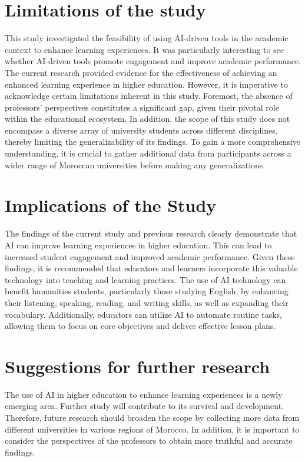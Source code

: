 \section{Limitations of the study}
This study investigated the feasibility of using AI-driven tools in the academic context to enhance learning experiences.
It was particularly interesting to see whether AI-driven tools promote engagement and improve academic performance.
The current research provided evidence for the effectiveness of achieving an enhanced learning experience in higher education.
 However, it is imperative to acknowledge certain limitations inherent in this study. 
Foremost, the absence of professors' perspectives constitutes a significant gap, 
given their pivotal role within the educational ecosystem. In addition,
the scope of this study does not encompass a diverse array of university 
students across different disciplines, thereby limiting the generalizability 
of its findings. To gain a more comprehensive understanding, 
it is crucial to gather additional data 
from participants across a wider range of Moroccan universities before making any generalizations.
\section{Implications of the Study}

The findings of the current study and previous research clearly demonstrate that AI can
improve learning experiences in higher education.
This can lead to increased student engagement and improved academic performance.
Given these findings, it is recommended that educators and learners incorporate this valuable
technology into teaching and learning practices. The use of AI technology can benefit humanities
students, particularly those studying English, by enhancing their listening, speaking, reading, 
and writing skills, as well as expanding their vocabulary. Additionally, educators can utilize 
AI to automate routine tasks, allowing them to focus on core objectives and deliver effective lesson plans.

\section{Suggestions for further research}

The use of AI in higher education to enhance learning experiences is a newly emerging area.
Further study will contribute to its survival and development.
Therefore, future research should broaden the scope by collecting more data 
from different universities in various regions of Morocco. 
In addition, it is important to consider the perspectives of the professors to obtain more truthful and accurate findings.

